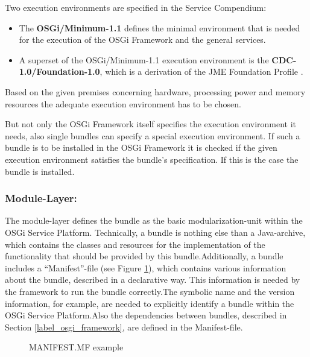 Two execution environments are specified in the Service Compendium:
\begin{itemize}
  \item The \textbf{OSGi/Minimum-1.1} defines the minimal environment that is needed for the
  execution of the OSGi Framework and the general services.
  \item A superset of the OSGi/Minimum-1.1 execution environment is the
  \textbf{CDC-1.0/Foundation-1.0}, which is a derivation of the JME Foundation Profile
  \cite{jme_foundation_profile}.
\end{itemize}

Based on the given premises concerning hardware, processing power and memory
resources the adequate execution environment has to be chosen.

But not only the OSGi Framework itself specifies the execution environment it
needs, also single bundles can specify a special execution environment. If such
a bundle is to be installed in the OSGi Framework it is checked if the given
execution environment satisfies the bundle's specification. If this is the case
the bundle is installed.

\subsubsection{Module-Layer:} \label{paragraph_module_layer} The module-layer
defines the bundle as the basic modularization-unit within the OSGi Service Platform. Technically, a bundle is
nothing else than a Java-archive, which contains the classes and resources for
the implementation of the functionality that should be provided by this
bundle.\newline Additionally, a bundle includes a ``Manifest''-file (see Figure
\ref{fig:manifest}), which contains various information about the bundle,
described in a declarative way. This information is needed by the framework to
run the bundle correctly.\newline The symbolic name and the version information,
for example, are needed to explicitly identify a bundle within the OSGi Service
Platform.\newline Also the dependencies between bundles, described in Section
\ref{label_osgi_framework}, are defined in the Manifest-file.

\begin{figure}
	\centering
	\caption{MANIFEST.MF example}
	\label{fig:manifest}
\end{figure}

